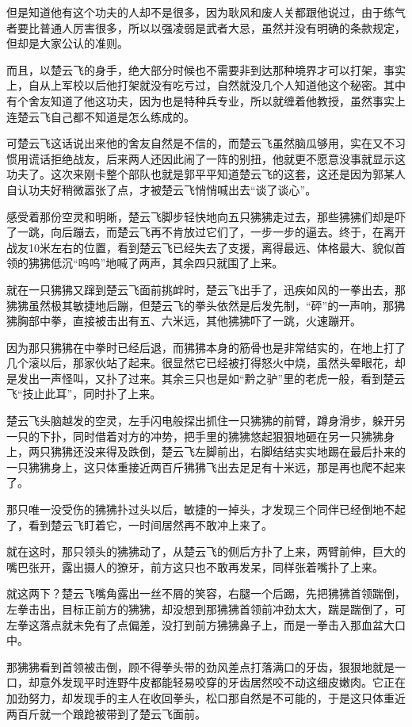 但是知道他有这个功夫的人却不是很多，因为耿风和废人关都跟他说过，由于练气者要比普通人厉害很多，所以以强凌弱是武者大忌，虽然并没有明确的条款规定，但却是大家公认的准则。

而且，以楚云飞的身手，绝大部分时候也不需要非到达那种境界才可以打架，事实上，自从上军校以后他打架就没有吃亏过，自然就没几个人知道他这个秘密。其中有个舍友知道了他这功夫，因为也是特种兵专业，所以就缠着他教授，虽然事实上连楚云飞自己都不知道是怎么练成的。

可楚云飞这话说出来他的舍友自然是不信的，而楚云飞虽然脑瓜够用，实在又不习惯用谎话拒绝战友，后来两人还因此闹了一阵的别扭，他就更不愿意没事就显示这功夫了。这次来刚卡整个部队也就是郭平平知道楚云飞的这套，这还是因为郭某人自认功夫好稍微嚣张了点，才被楚云飞悄悄喊出去“谈了谈心”。

感受着那份空灵和明晰，楚云飞脚步轻快地向五只狒狒走过去，那些狒狒们却是吓了一跳，向后蹦去，而楚云飞再不肯放过它们了，一步一步的逼去。终于，在离开战友10米左右的位置，看到楚云飞已经失去了支援，离得最远、体格最大、貌似首领的狒狒低沉“呜呜”地喊了两声，其余四只就围了上来。

就在一只狒狒又蹿到楚云飞面前挑衅时，楚云飞出手了，迅疾如风的一拳出去，那狒狒虽然极其敏捷地后蹦，但楚云飞的拳头依然是后发先制，“砰”的一声响，那狒狒胸部中拳，直接被击出有五、六米远，其他狒狒吓了一跳，火速蹦开。

因为那只狒狒在中拳时已经后退，而狒狒本身的筋骨也是非常结实的，在地上打了几个滚以后，那家伙站了起来。很显然它已经被打得怒火中烧，虽然头晕眼花，却是发出一声怪叫，又扑了过来。其余三只也是如“黔之驴”里的老虎一般，看到楚云飞“技止此耳”，同时扑了上来。

楚云飞头脑越发的空灵，左手闪电般探出抓住一只狒狒的前臂，蹲身滑步，躲开另一只的下扑，同时借着对方的冲势，把手里的狒狒悠起狠狠地砸在另一只狒狒身上，两只狒狒还没来得及跌倒，楚云飞左脚前出，右脚结结实实地踢在最后扑来的一只狒狒身上，这只体重接近两百斤狒狒飞出去足足有十米远，那是再也爬不起来了。

那只唯一没受伤的狒狒扑过头以后，敏捷的一掉头，才发现三个同伴已经倒地不起了，看到楚云飞盯着它，一时间居然再不敢冲上来了。

就在这时，那只领头的狒狒动了，从楚云飞的侧后方扑了上来，两臂前伸，巨大的嘴巴张开，露出摄人的獠牙，前方这只也不敢再发呆，同样张着嘴扑了上来。

就这两下？楚云飞嘴角露出一丝不屑的笑容，右腿一个后踢，先把狒狒首领踹倒，左拳击出，目标正前方的狒狒，却没想到那狒狒首领前冲劲太大，踹是踹倒了，可左拳这落点就未免有了点偏差，没打到前方狒狒鼻子上，而是一拳击入那血盆大口中。

那狒狒看到首领被击倒，顾不得拳头带的劲风差点打落满口的牙齿，狠狠地就是一口，却意外发现平时连野牛皮都能轻易咬穿的牙齿居然咬不动这细皮嫩肉。它正在加劲努力，却发现手的主人在收回拳头，松口那自然是不可能的，于是这只体重近两百斤就一个踉跄被带到了楚云飞面前。

